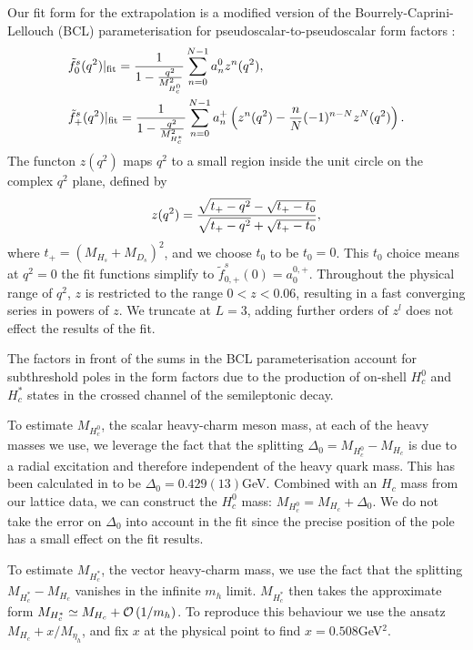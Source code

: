 Our fit form for the extrapolation is a modified version of the Bourrely-Caprini-Lellouch (BCL) parameterisation for pseudoscalar-to-pseudoscalar form factors \cite{Bourrely:2008za}:
\begin{align}
  \label{eq:BCL}
  &\tilde{f}^s_0(q^2)|_{\text{fit}} = {1\over 1 - {q^2\over M_{H_c^0}^2} } \sum_{n=0}^{N-1} a_n^0 z^n(q^2), \\
  &\tilde{f}^s_+(q^2)|_{\text{fit}} = {1\over 1 - {q^2\over M_{H_c^*}^2} } \sum_{n=0}^{N-1} a_n^+ \left( z^n(q^2) - {n\over N} (-1)^{n-N} z^N(q^2) \right). \nonumber
\end{align}
The functon $z(q^2)$ maps $q^2$ to a small region inside the unit circle on the complex $q^2$ plane, defined by
\begin{align}
  z(q^2) = {\sqrt{t_+ - q^2} - \sqrt{t_+ - t_0} \over \sqrt{t_+ - q^2} + \sqrt{t_+ - t_0} },
\end{align}
where $t_+ = (M_{H_s}+M_{D_s})^2$, and we choose $t_0$ to be $t_0 = 0$. This $t_0$ choice means at $q^2=0$ the fit functions simplify to $\tilde{f}_{0,+}^s(0) = a_0^{0,+}$. Throughout the physical range of $q^2$, $z$ is restricted to the range $0<z<0.06$, resulting in a fast converging series in powers of $z$. We truncate at $L=3$, adding further orders of $z^l$ does not effect the results of the fit.

The factors in front of the sums in the BCL parameterisation account for subthreshold poles in the form factors due to the production of on-shell $H_c^0$ and $H_c^*$ states in the crossed channel of the semileptonic decay.

To estimate $M_{H_c^0}$, the scalar heavy-charm meson mass, at each of the heavy masses we use, we leverage the fact that the splitting $\Delta_0 = M_{H_c^0} - M_{H_c}$ is due to a radial excitation and therefore independent of the heavy quark mass. This has been calculated in \cite{Dowdall:2012ab} to be $\Delta_0 = 0.429(13)$GeV. Combined with an $H_c$ mass from our lattice data, we can construct the $H_c^0$ mass: $M_{H_c^0} = M_{H_c} + \Delta_0$. We do not take the error on $\Delta_0$ into account in the fit since the precise position of the pole has a small effect on the fit results.

To estimate $M_{H^*_c}$, the vector heavy-charm mass, we use the fact that the splitting $ M_{H_c^*} - M_{H_c}$ vanishes in the infinite $m_h$ limit. $M_{H_c^*}$ then takes the approximate form $M_{H_c^*} \simeq M_{H_c} + \mathcal{O}\left( 1/m_h \right)$. To reproduce this behaviour we use the ansatz $M_{H_c} + x/M_{\eta_h}$, and fix $x$ at the physical point to find $x=0.508$GeV$^2$.

